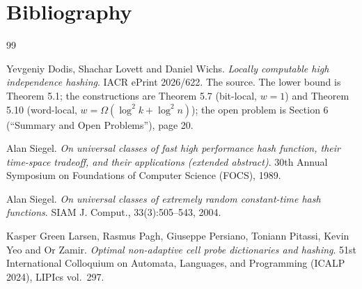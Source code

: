 \documentclass{aicr-conjecture}
\newcommand{\Om}{\Omega}
\begin{document}
\section{Bibliography}

\begin{aicrbibliography}{99}

Yevgeniy Dodis, Shachar Lovett and Daniel Wichs.
\emph{Locally computable high independence hashing}.
IACR ePrint 2026/622.
The source. The lower bound is Theorem 5.1; the constructions are
Theorem 5.7 (bit-local, $w=1$) and Theorem 5.10 (word-local, $w =
\Om(\log^{2}k + \log^{2}n)$); the open problem is Section 6 (``Summary
and Open Problems''), page 20.

Alan Siegel.
\emph{On universal classes of fast high performance hash function,
their time-space tradeoff, and their applications (extended
abstract)}.
30th Annual Symposium on Foundations of Computer Science (FOCS), 1989.

Alan Siegel.
\emph{On universal classes of extremely random constant-time hash
functions}.
SIAM J. Comput., 33(3):505--543, 2004.

Kasper Green Larsen, Rasmus Pagh, Giuseppe Persiano, Toniann Pitassi,
Kevin Yeo and Or Zamir.
\emph{Optimal non-adaptive cell probe dictionaries and hashing}.
51st International Colloquium on Automata, Languages, and Programming
(ICALP 2024), LIPIcs vol.\ 297.

\end{aicrbibliography}
\end{document}
